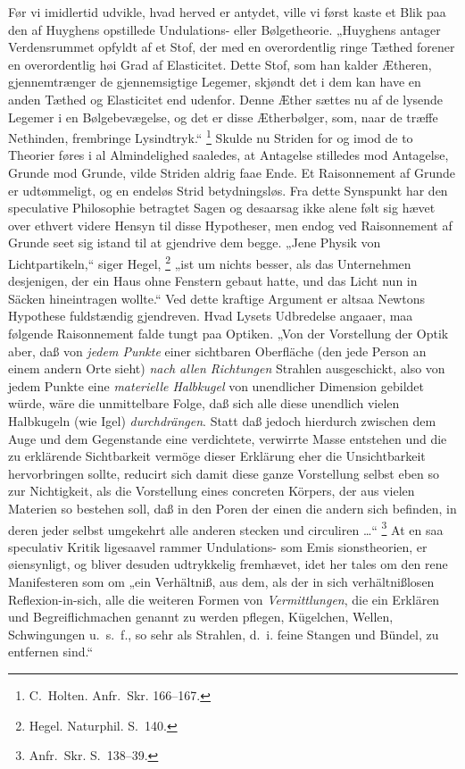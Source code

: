 \documentclass[12pt]{book}
\newcommand{\opage}[1]{\marginnote{\footnotesize\textit{[#1]}}}
\newcommand{\apage}[1]{\marginnote{\footnotesize\textit{[#1]}}}
\begin{document}
Før vi imidlertid udvikle, hvad herved er antydet, ville vi først kaste et Blik paa den af
Huyghens opstillede Undulations- eller Bølgetheorie. „Huyghens antager Verdensrummet opfyldt
af et Stof, der med en overordentlig ringe Tæthed forener en overordentlig høi Grad af
Elasticitet. Dette Stof, som han kalder Ætheren, gjennemtrænger de gjennemsigtige Legemer,
skjøndt det i dem kan have en anden Tæthed og Elasticitet end udenfor. Denne Æther sættes nu
af de lysende Legemer i en Bølgebevægelse, og det er disse Ætherbølger, som, naar de træffe
Nethinden, frembringe Lysindtryk.“%
\footnote{C.\ Holten. Anfr.\ Skr. 166--167.}
\opage{378} Skulde nu Striden for og imod de to Theorier føres i al Almindelighed saaledes, at Antagelse
stilledes mod Antagelse, Grunde mod Grunde, vilde Striden aldrig faae Ende. Et Raisonnement
af Grunde er udtømmeligt, og en endeløs Strid betydningsløs. Fra dette Synspunkt har den
speculative Philosophie betragtet Sagen og desaarsag ikke alene følt sig hævet over ethvert
videre Hensyn til disse Hypotheser, men endog ved Raisonnement af Grunde seet sig istand til
at gjendrive dem begge. „Jene Physik von Lichtpartikeln,“ siger Hegel,%
\footnote{Hegel. Naturphil. S.~140.}
„ist um nichts besser, als das Unternehmen desjenigen, der ein Haus ohne Fenstern gebaut
hatte, und das Licht nun in Säcken hineintragen wollte.“ Ved dette kraftige Argument er
altsaa Newtons Hypothese fuldstændig gjendreven. Hvad Lysets Udbredelse angaaer, maa følgende
Raisonnement falde tungt paa Optiken. „Von der Vorstellung der Optik aber, daß von
\emph{jedem Punkte} einer sichtbaren Oberfläche (den jede Person an einem andern Orte sieht)
\emph{nach allen Richtungen} Strahlen ausgeschickt, also von jedem Punkte eine
\emph{materielle Halbkugel} von unendlicher Dimension gebildet würde, wäre die unmittelbare
Folge, daß sich alle diese unendlich vielen Halbkugeln (wie Igel) \emph{durchdrängen}. Statt
daß jedoch hierdurch zwischen dem Auge und dem Gegenstande eine verdichtete, verwirrte Masse
entstehen und die zu erklärende Sichtbarkeit vermöge dieser Erklärung eher die Unsichtbarkeit
hervorbringen sollte, reducirt sich damit diese ganze Vorstellung selbst eben so zur
Nichtigkeit, als die Vorstellung eines concreten Körpers, der aus vielen Materien so bestehen
soll, daß in den Poren der einen die andern sich befinden, in deren jeder selbst umgekehrt
alle anderen stecken und circuliren \ldots“%
\footnote{Anfr.\ Skr. S.~138--39.}
At en saa speculativ Kritik ligesaavel rammer Undulations- som Emis\-%
 \apage{379}sionstheorien, er øiensynligt, og bliver desuden udtrykkelig fremhævet, idet her tales om den
rene Manifesteren som om „ein Verhältniß, aus dem, als der in sich verhältnißlosen
Reflexion-in-sich, alle die weiteren Formen von \emph{Vermittlungen}, die ein Erklären und
Begreiflichmachen genannt zu werden pflegen, Kügelchen, Wellen, Schwingungen u.\ s.\ f., so
sehr als Strahlen, d.\ i. feine Stangen und Bündel, zu entfernen sind.“
\end{document}
